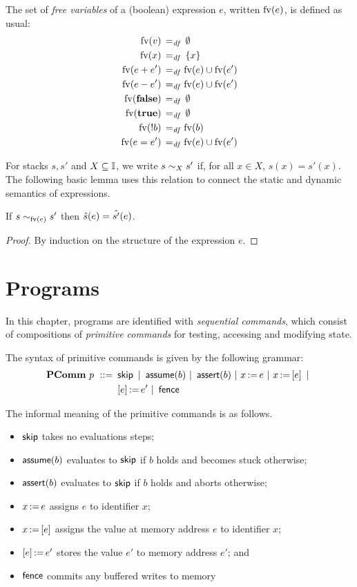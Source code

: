 \documentclass[11pt]{report}
\begin{document}
The set of \emph{free variables} of a (boolean) expression $e$, written $\mathrm{fv}(e)$, is defined as usual: \begin{align*}
    \mathrm{fv}(v) \operatorname{\;=_{\mathit{df}}\;} & \operatorname{\emptyset} \\ 
    \mathrm{fv}(x) \operatorname{\;=_{\mathit{df}}\;} & \left\lbrace x \right\rbrace \\ 
    \mathrm{fv}(e + e') \operatorname{\;=_{\mathit{df}}\;} & \mathrm{fv}(e) \cup \mathrm{fv}(e') \\ 
    \mathrm{fv}(e - e') \operatorname{\;=_{\mathit{df}}\;} & \mathrm{fv}(e) \cup \mathrm{fv}(e') \\ 
    \mathrm{fv}(\mathbf{false}) \operatorname{\;=_{\mathit{df}}\;} & \operatorname{\emptyset} \\ 
    \mathrm{fv}(\mathbf{true}) \operatorname{\;=_{\mathit{df}}\;} & \operatorname{\emptyset} \\ 
    \mathrm{fv}(!b) \operatorname{\;=_{\mathit{df}}\;} & \mathrm{fv}(b) \\ 
    \mathrm{fv}(e = e') \operatorname{\;=_{\mathit{df}}\;} & \mathrm{fv}(e) \cup \mathrm{fv}(e')
\end{align*}

For stacks $s,s'$ and $X \subseteq \mathbb{I}$, we write $s \sim_{X} s'$ if, for all $x \in X$, $s(x) = s'(x)$. The following basic lemma uses this relation to connect the static and dynamic semantics of expressions. 
\begin{lemma}
\label{lem:exp-stcong}
    If $s \sim_{\mathrm{fv}(e)} s'$ then $\hat{s}(e) = \hat{s'}(e)$. 
\end{lemma}

\begin{proof}
By induction on the structure of the expression $e$. 
\end{proof}

\section{Programs}
\label{sec:sequential-programs}

In this chapter, programs are identified with \emph{sequential commands}, which consist of compositions of \emph{primitive commands} for testing, accessing and modifying state. 

The syntax of primitive commands is given by the following grammar: \begin{align*} \mathbf{PComm}~p ~::=~ & \operatorname{\mathsf{skip}} ~|~ \operatorname{\mathsf{assume}}(b) ~|~ \operatorname{\mathsf{assert}}(b) ~|~ x \operatorname{:\!=} e ~|~ x \operatorname{:\!=} \left[ e \right] ~|~ \\ 
    & \left[ e \right] \operatorname{:\!=} e' ~|~ \operatorname{\mathsf{fence}}
\end{align*}

The informal meaning of the primitive commands is as follows. \begin{itemize}
    \item $\operatorname{\mathsf{skip}}$ takes no evaluations steps;
    \item $\operatorname{\mathsf{assume}}(b)$ evaluates to $\operatorname{\mathsf{skip}}$ if $b$ holds and becomes stuck otherwise; 
    \item $\operatorname{\mathsf{assert}}(b)$ evaluates to $\operatorname{\mathsf{skip}}$ if $b$ holds and aborts otherwise;
    \item $x \operatorname{:\!=} e$ assigns $e$ to identifier $x$; 
    \item $x \operatorname{:\!=} \left[ e \right]$ assigns the value at memory address $e$ to identifier $x$; 
    \item $\left[ e \right] \operatorname{:\!=} e'$ stores the value $e'$ to memory address $e'$; and
    \item $\operatorname{\mathsf{fence}}$ commits any buffered writes to memory 
\end{itemize}
\end{document}
